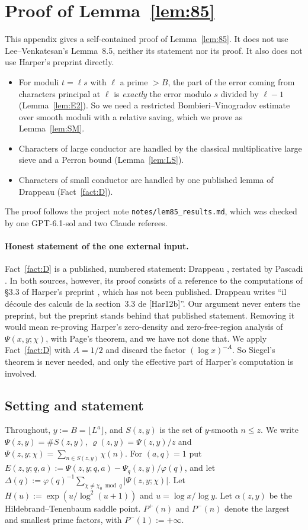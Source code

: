 \documentclass[11pt]{amsart}
\theoremstyle{definition}
\newcommand{\Pp}{P^{+}}
\begin{document}
\appendix
\section{Proof of Lemma~\ref{lem:85}}\label{app:85}

This appendix gives a self-contained proof of Lemma~\ref{lem:85}. It does not use Lee--Venkatesan's Lemma~8.5,
neither its statement nor its proof. It also does not use Harper's preprint \cite{harper2012} directly.
\begin{itemize}
\item For moduli $t=\ell s$ with $\ell$ a prime $>B$, the part of the error coming from characters principal at $\ell$ is
  \emph{exactly} the error modulo $s$ divided by $\ell-1$ (Lemma~\ref{lem:E2}). So we need a restricted Bombieri--Vinogradov estimate over
  smooth moduli with a relative saving, which we prove as Lemma~\ref{lem:SM}.
\item Characters of large conductor are handled by the classical multiplicative large sieve and a Perron bound (Lemma~\ref{lem:LS}).
\item Characters of small conductor are handled by one published lemma of Drappeau (Fact~\ref{fact:D}).
\end{itemize}
The proof follows the project note \texttt{notes/lem85\_results.md}, which was checked by one GPT-6.1-sol and two Claude referees.

\paragraph{Honest statement of the one external input.} Fact~\ref{fact:D} is a published, numbered statement:
Drappeau \cite[Lemme~5]{drappeau2015}, restated by Pascadi \cite[Lemma~3.2]{pascadi2025}. In both sources, however, its proof
consists of a reference to the computations of \S3.3 of Harper's preprint \cite{harper2012}, which has not been published. Drappeau
writes ``il d\'ecoule des calculs de la section~3.3 de [Har12b]''. Our argument never enters the preprint, but the preprint stands
behind that published statement. Removing it would mean re-proving Harper's zero-density and zero-free-region analysis of
$\Psi(x,y;\chi)$, with Page's theorem, and we have not done that. We apply Fact~\ref{fact:D} with $A=1/2$ and discard the factor
$(\log x)^{-A}$. So Siegel's theorem is never needed, and only the effective part of Harper's computation is involved.

\subsection{Setting and statement}
Throughout, $y:=B=\lfloor L^a\rfloor$, and $S(z,y)$ is the set of $y$-smooth $n\le z$. We write $\Psi(z,y)=\#S(z,y)$,
$\varrho(z,y)=\Psi(z,y)/z$ and $\Psi(z,y;\chi)=\sum_{n\in S(z,y)}\chi(n)$. For $(a,q)=1$ put
$E(z,y;q,a):=\Psi(z,y;q,a)-\Psi_q(z,y)/\varphi(q)$, and let $\Delta(q):=\varphi(q)^{-1}\sum_{\chi\ne\chi_0\bmod q}|\Psi(z,y;\chi)|$. Let
$H(u):=\exp(u/\log^2(u+1))$ and $u=\log x/\log y$. Let $\alpha(z,y)$ be the Hildebrand--Tenenbaum saddle point. $\Pp(n)$ and
$P^-(n)$ denote the largest and smallest prime factors, with $P^-(1):=+\infty$.
\end{document}
